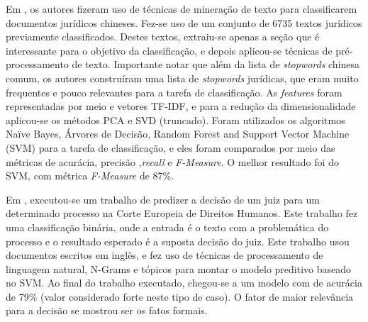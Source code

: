 
Em \cite{chinese}, os autores fizeram uso de técnicas de mineração de texto para classificarem documentos jurídicos chineses. Fez-se uso de um conjunto de 6735 textos jurídicos previamente classificados. Destes textos, extraiu-se apenas a seção que é interessante para o objetivo da classificação, e depois aplicou-se técnicas de pré-processamento de texto. Importante notar que além da lista de \textit{stopwords} chinesa comum, os autores construíram uma lista de \textit{stopwords} jurídicas, que eram muito frequentes e pouco relevantes para a tarefa de classificação. As \textit{features} foram representadas por meio e vetores TF-IDF, e para a redução da dimensionalidade  aplicou-se os métodos PCA e SVD (truncado). Foram utilizados os algoritmos Naïve Bayes, Árvores de Decisão, Random Forest and Support Vector Machine (SVM) para a tarefa de classificação, e eles foram comparados por meio das métricas de acurácia, precisão ,\textit{recall} e \textit{F-Measure}. O melhor resultado foi do SVM, com métrica \textit{F-Measure} de 87\%.

Em \cite{european_court}, executou-se um trabalho de predizer a decisão de um juiz para um determinado processo na Corte Europeia de Direitos Humanos. Este trabalho fez uma classificação binária, onde a entrada é o texto com a problemática do processo e o resultado esperado é a suposta decisão do juiz. Este trabalho usou documentos escritos em inglês, e fez uso de técnicas de processamento de linguagem natural, N-Grams e tópicos para montar o modelo preditivo baseado no SVM. Ao final do trabalho executado, chegou-se a um modelo com de acurácia de 79\% (valor considerado forte neste tipo de caso). O fator de maior relevância para a decisão se mostrou ser os fatos formais.










